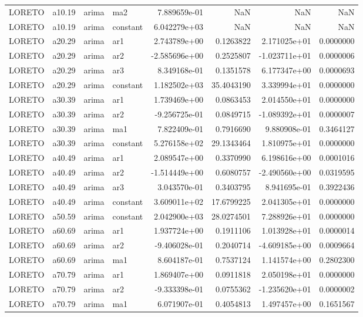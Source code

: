 \documentclass[
]{article}
\begin{document}
\begin{table}[!h]
\begin{tabular}[t]{llllrrrr}
LORETO & a10.19 & arima & ma2 & 7.889659e-01 & NaN & NaN & NaN\\
LORETO & a10.19 & arima & constant & 6.042279e+03 & NaN & NaN & NaN\\
LORETO & a20.29 & arima & ar1 & 2.743789e+00 & 0.1263822 & 2.171025e+01 & 0.0000000\\
LORETO & a20.29 & arima & ar2 & -2.585696e+00 & 0.2525807 & -1.023711e+01 & 0.0000006\\
\addlinespace
LORETO & a20.29 & arima & ar3 & 8.349168e-01 & 0.1351578 & 6.177347e+00 & 0.0000693\\
LORETO & a20.29 & arima & constant & 1.182502e+03 & 35.4043190 & 3.339994e+01 & 0.0000000\\
LORETO & a30.39 & arima & ar1 & 1.739469e+00 & 0.0863453 & 2.014550e+01 & 0.0000000\\
LORETO & a30.39 & arima & ar2 & -9.256725e-01 & 0.0849715 & -1.089392e+01 & 0.0000007\\
LORETO & a30.39 & arima & ma1 & 7.822409e-01 & 0.7916690 & 9.880908e-01 & 0.3464127\\
\addlinespace
LORETO & a30.39 & arima & constant & 5.276158e+02 & 29.1343464 & 1.810975e+01 & 0.0000000\\
LORETO & a40.49 & arima & ar1 & 2.089547e+00 & 0.3370990 & 6.198616e+00 & 0.0001016\\
LORETO & a40.49 & arima & ar2 & -1.514449e+00 & 0.6080757 & -2.490560e+00 & 0.0319595\\
LORETO & a40.49 & arima & ar3 & 3.043570e-01 & 0.3403795 & 8.941695e-01 & 0.3922436\\
LORETO & a40.49 & arima & constant & 3.609011e+02 & 17.6799225 & 2.041305e+01 & 0.0000000\\
\addlinespace
LORETO & a50.59 & arima & constant & 2.042900e+03 & 28.0274501 & 7.288926e+01 & 0.0000000\\
LORETO & a60.69 & arima & ar1 & 1.937724e+00 & 0.1911106 & 1.013928e+01 & 0.0000014\\
LORETO & a60.69 & arima & ar2 & -9.406028e-01 & 0.2040714 & -4.609185e+00 & 0.0009664\\
LORETO & a60.69 & arima & ma1 & 8.604187e-01 & 0.7537124 & 1.141574e+00 & 0.2802300\\
LORETO & a70.79 & arima & ar1 & 1.869407e+00 & 0.0911818 & 2.050198e+01 & 0.0000000\\
\addlinespace
LORETO & a70.79 & arima & ar2 & -9.333398e-01 & 0.0755362 & -1.235620e+01 & 0.0000002\\
LORETO & a70.79 & arima & ma1 & 6.071907e-01 & 0.4054813 & 1.497457e+00 & 0.1651567\\

\end{tabular}
\end{table}
\end{document}
